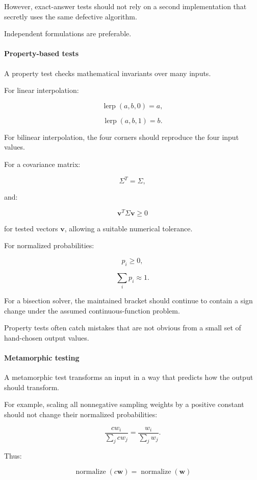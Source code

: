 However, exact-answer tests should not rely on a second implementation that secretly uses the same defective algorithm.

Independent formulations are preferable.

\paragraph{Property-based tests}\label{property-based-tests}

A property test checks mathematical invariants over many inputs.

For linear interpolation:

\[ \operatorname{lerp}(a,b,0)=a, \]

\[ \operatorname{lerp}(a,b,1)=b. \]

For bilinear interpolation, the four corners should reproduce the four input values.

For a covariance matrix:

\[ \Sigma^T=\Sigma, \]

and:

\[ \mathbf v^T\Sigma\mathbf v\ge0 \]

for tested vectors \(\mathbf v\), allowing a suitable numerical tolerance.

For normalized probabilities:

\[ p_i\ge0, \]

\[ \sum_ip_i\approx1. \]

For a bisection solver, the maintained bracket should continue to contain a sign change under the assumed continuous-function problem.

Property tests often catch mistakes that are not obvious from a small set of hand-chosen output values.

\paragraph{Metamorphic testing}\label{metamorphic-testing}

A metamorphic test transforms an input in a way that predicts how the output should transform.

For example, scaling all nonnegative sampling weights by a positive constant should not change their normalized probabilities:

\[ \frac{cw_i}{\sum_jcw_j} = \frac{w_i}{\sum_jw_j}. \]

Thus:

\[ \boxed{ \operatorname{normalize}(c\mathbf w) = \operatorname{normalize}(\mathbf w) } \]

